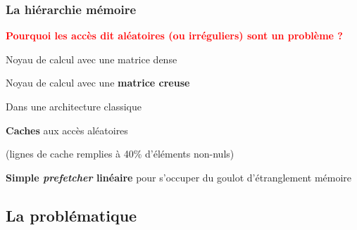 \begin{frame}
    \frametitle{La hiérarchie mémoire}

    \textcolor{Red}{\textbf{Pourquoi les accès dit \og aléatoires \fg{} (ou irréguliers) sont un problème ?}}

    \bigskip

    \parbox[t]{7cm}{Noyau de calcul avec une matrice dense} 

    \parbox[t]{7cm}{Noyau de calcul avec une \textbf{matrice creuse}} 

    \bigskip

    Dans une architecture classique


    \bigskip\bigskip

    \textbf{Caches}  aux accès \og aléatoires \fg{}

     \hfill \textcolor{black!50}{(lignes de cache remplies à 40\% d'éléments non-nuls)}


    

    \medskip

    \textbf{Simple \textit{prefetcher} linéaire} \arrow[\bfseries\color{Red}]{pas suffisant} pour s'occuper du goulot d'étranglement mémoire

\end{frame}

\subsection{La problématique}

